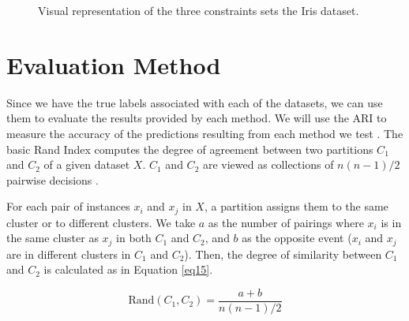 \begin{figure}[bth]
	\caption{Visual representation of the three constraints sets the Iris dataset.}
	\label{fig:IrisConst}
\end{figure}

\section{Evaluation Method} \label{sec:EvalMet}

Since we have the true labels associated with each of the datasets, we can use them to evaluate the results provided by each method. We will use the \acf{ARI} to measure the accuracy of the predictions resulting from each method we test \cite{hubert1985comparing}. The basic Rand Index computes the degree of agreement between two partitions $C_1$ and $C_2$ of a given dataset $X$. $C_1$ and $C_2$ are viewed as collections of $n(n - 1)/2$ pairwise decisions \cite{rand1971objective}.

For each pair of instances $x_i$ and $x_j$ in $X$, a partition assigns them to the same cluster or to different clusters. We take $a$ as the number of pairings where $x_i$ is in the same cluster as $x_j$ in both $C_1$ and $C_2$, and $b$ as the opposite event ($x_i$ and $x_j$ are in different clusters in $C_1$ and $C_2$). Then, the degree of similarity between $C_1$ and $C_2$ is calculated as in Equation \eqref{eq15}.

\begin{equation}
\text{Rand}(C_1, C_2) = \frac{a + b}{n(n - 1)/2}
\label{eq15}
\end{equation}

